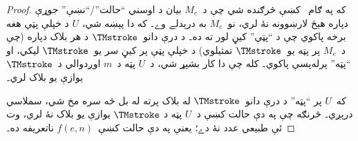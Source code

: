 \documentclass[../../../include/open-logic-section]{subfiles}
\begin{document}
\begin{proof}
  که په ګام~ کښې څرګنده شي چې د~$M_e$ بيان د اوسني
  ``حالت''/``نښې'' جوړې دپاره هېڅ لارښوونه نۀ لري، نو~$M_e$ به
  درېدلے وے۔ که دا پېښه شي، $U$ د خپلې پټې هغه برخه پاکوي چې د
  ``پټې'' کيڼ لور ته ده۔ د درې دانو~$\TMstroke$ د هر بلاک دپاره
  (چې د~$M_e$ پر پټه يو~$\TMstroke$ تمثيلوي) د خپلې پټې پر کيڼ سر
  يو~$\TMstroke$ ليکي، او ``پټه'' پرله‌پسې پاکوي۔ کله چې دا کار بشپړ
  شي، د~$U$ پټه د~$m$ اوږدوالي د~$\TMstroke$ يوازې يو بلاک لري۔

  که~$U$ پر ``پټه'' د درې دانو~$\TMstroke$ له بلاک پرته له بل څه
  سره مخ شي، سملاسي درېږي۔ څرنګه چې په دې حالت کښې د~$U$ پټه د
  $\TMstroke$ يوازې يو بلاک نۀ لري، وت ئې طبيعي عدد نۀ دے؛ يعنې په
  دې حالت کښې~$f(e,n)$ ناتعريفه ده۔
\end{proof}
\end{document}
